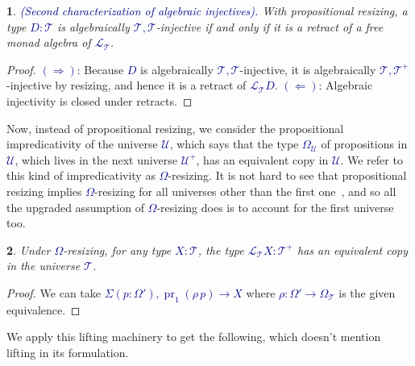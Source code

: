 \documentclass[10pt]{article}
\newcommand{\db}{\textcolor{darkblue}}
\newcommand{\df}[1]{\emph{\db{#1}}}
\newcommand{\m}[1]{\db{$#1$}}
\newcommand{\fst}{\operatorname{pr}_1}
\newcommand{\U}{\mathcal{U}}
\newcommand{\T}{\mathcal{T}}
\newcommand{\Lift}{\mathcal{L}}
\newtheorem{numbered}{}
\theoremstyle{definition}
\begin{document}
\begin{numbered} \df{(Second characterization of algebraic injectives).}
  With propositional resizing, a type \m{D:\T} is algebraically
  \m{\T,\T}-injective if and only if it is a retract of a free monad
  algebra of \m{\Lift_\T}.
\end{numbered}
\begin{proof}
  \m{(\Rightarrow)}: Because \m{D} is algebraically
  \m{\T,\T}-injective, it is algebraically \m{\T,\T^+}-injective by
  resizing, and hence it is a retract of \m{\Lift_\T D}.
%
  \m{(\Leftarrow)}: Algebraic injectivity is closed under retracts.
\end{proof}



Now, instead of propositional resizing, we consider the propositional
impredicativity of the universe \m{\U}, which says that the type
\m{\Omega_\U} of propositions in \m{\U}, which lives in the next
universe \m{\U^+}, has an equivalent copy in \m{\U}. We refer to this
kind of impredicativity as \m{\Omega}-resizing. It is not hard to see
that propositional resizing implies \m{\Omega}-resizing for all
universes other than the first one~\cite{TypeTopology}, and so all
the upgraded assumption of \m{\Omega}-resizing does is to account
for the first universe too.

%

\begin{numbered}
  Under \m{\Omega}-resizing, for any type \m{X:\T}, the type
  \m{\Lift_{\T} X : \T^+} has an equivalent copy in the universe \m{\T}.
\end{numbered}
\begin{proof}
  We can take \m{\Sigma (p : \Omega'), \fst(\rho \, p) \to X} where \m{\rho : \Omega' \to \Omega_\T} is the given equivalence.
\end{proof}

We apply this lifting machinery to get the following, which doesn't
mention lifting in its formulation.
\end{document}
